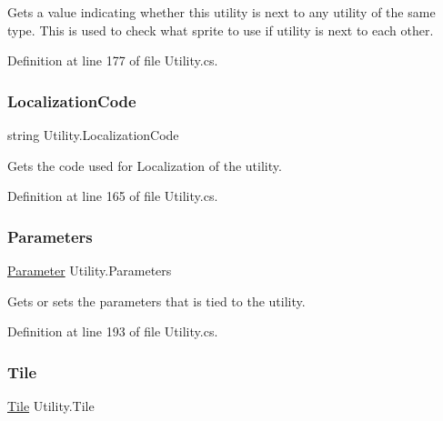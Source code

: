 Gets a value indicating whether this utility is next to any utility of the same type. This is used to check what sprite to use if utility is next to each other. 



Definition at line 177 of file Utility.\+cs.

\mbox{\label{class_utility_a6f65ac813baf71fa3dd074cdc5f0dac9}} 
\subsubsection{\texorpdfstring{Localization\+Code}{LocalizationCode}}
{\footnotesize\ttfamily string Utility.\+Localization\+Code\hspace{0.3cm}{\ttfamily [get]}}



Gets the code used for Localization of the utility. 



Definition at line 165 of file Utility.\+cs.

\mbox{\label{class_utility_a658da302287ff04bf872426e46d6eac6}} 
\subsubsection{\texorpdfstring{Parameters}{Parameters}}
{\footnotesize\ttfamily \hyperlink{class_parameter}{Parameter} Utility.\+Parameters\hspace{0.3cm}{\ttfamily [get]}}



Gets or sets the parameters that is tied to the utility. 



Definition at line 193 of file Utility.\+cs.

\mbox{\label{class_utility_a4c2701b68c0b9edf73a2ebf30507cd5f}} 
\subsubsection{\texorpdfstring{Tile}{Tile}}
{\footnotesize\ttfamily \hyperlink{class_tile}{Tile} Utility.\+Tile\hspace{0.3cm}{\ttfamily [get]}}



